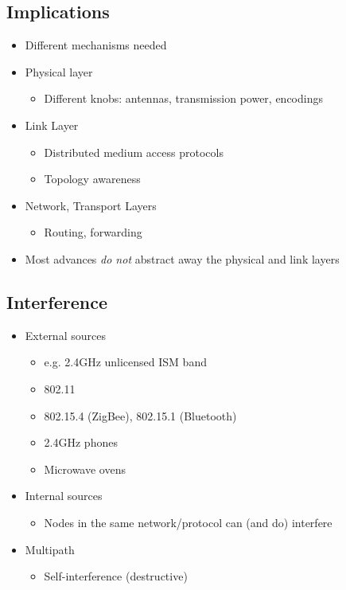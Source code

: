 \subsection{Implications}
\begin{itemize}[nosep]
    \item Different mechanisms needed
    \item Physical layer
          \begin{itemize}[nosep]
              \item Different knobs: antennas, transmission power, encodings
          \end{itemize}
    \item Link Layer
          \begin{itemize}[nosep]
              \item Distributed medium access protocols
              \item Topology awareness
          \end{itemize}
    \item Network, Transport Layers
          \begin{itemize}[nosep]
              \item Routing, forwarding
          \end{itemize}
    \item Most advances \emph{do not} abstract away the physical and link layers
\end{itemize}

\subsection{Interference}
\begin{itemize}[nosep]
    \item External sources
          \begin{itemize}[nosep]
              \item e.g. 2.4\si{GHz} unlicensed ISM band
              \item 802.11
              \item 802.15.4 (ZigBee), 802.15.1 (Bluetooth)
              \item 2.4\si{GHz} phones
              \item Microwave ovens
          \end{itemize}
    \item Internal sources
          \begin{itemize}[nosep]
              \item Nodes in the same network/protocol can (and do) interfere
          \end{itemize}
    \item Multipath
          \begin{itemize}[nosep]
              \item Self-interference (destructive)
          \end{itemize}
\end{itemize}

